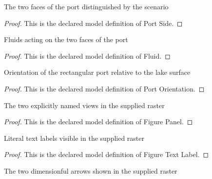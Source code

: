 \begin{definition}
  \label{def:physics:phyx-mini-0392:phyxminiproblems-problemphyxmini0392-portside}
  The two faces of the port distinguished by the scenario
\end{definition}
\begin{proof}
  This is the declared model definition of Port Side.
\end{proof}
\begin{definition}[Fluid]
  \label{def:physics:phyx-mini-0392:phyxminiproblems-problemphyxmini0392-fluid}
  Fluids acting on the two faces of the port
\end{definition}
\begin{proof}
  This is the declared model definition of Fluid.
\end{proof}
\begin{definition}
  \label{def:physics:phyx-mini-0392:phyxminiproblems-problemphyxmini0392-portorientation}
  Orientation of the rectangular port relative to the lake surface
\end{definition}
\begin{proof}
  This is the declared model definition of Port Orientation.
\end{proof}
\begin{definition}
  \label{def:physics:phyx-mini-0392:phyxminiproblems-problemphyxmini0392-figurepanel}
  The two explicitly named views in the supplied raster
\end{definition}
\begin{proof}
  This is the declared model definition of Figure Panel.
\end{proof}
\begin{definition}
  \label{def:physics:phyx-mini-0392:phyxminiproblems-problemphyxmini0392-figuretextlabel}
  Literal text labels visible in the supplied raster
\end{definition}
\begin{proof}
  This is the declared model definition of Figure Text Label.
\end{proof}
\begin{definition}
  \label{def:physics:phyx-mini-0392:phyxminiproblems-problemphyxmini0392-figurelengthmark}
  The two dimensionful arrows shown in the supplied raster
\end{definition}
